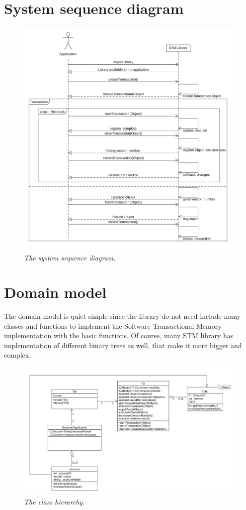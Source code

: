 \documentclass[12pt]{article}
\begin{document}
\section{System sequence diagram}
\begin{figure}[h!]
\centering
\includegraphics[scale=0.45]{Pictures/sequence.png}
\caption{\textit{\color{gray}The system sequence diagram.}}
\end{figure}

\newpage
\section{Domain model}
The domain model is quiet simple since the library do not need include many classes and functions to implement the Software Transactional Memory implementation with the basic functions. Of course, many STM library has implementation of different binary trees as well, that make it more bigger and complex. 
\begin{figure}[h!]
\centering
\includegraphics[scale=0.4]{Pictures/domainModel.png}
\caption{\textit{\color{gray}The class hierarchy.}}
\end{figure}
\end{document}
